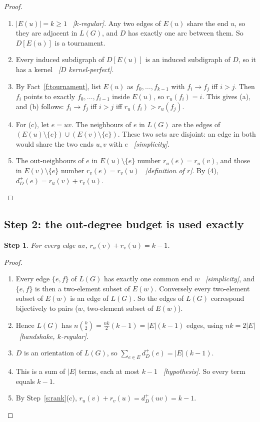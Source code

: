 \documentclass[11pt]{article}
\theoremstyle{plain}
\newtheorem{claim}{Step}
\theoremstyle{definition}
\newcommand{\LG}{L(G)}
\newcommand{\st}[1]{E(#1)}
\newcommand{\dout}{d^{+}}
\newcommand{\why}[1]{\unskip\ \textit{[#1]}}
\newenvironment{steps}{\begin{enumerate}[label=(\arabic*),leftmargin=2.2em,itemsep=0.35em]}{\end{enumerate}}
\begin{document}
\begin{proof}
\begin{steps}
  \item $|\st{u}|=k\ge 1$ \why{$k$-regular}. Any two edges of $\st{u}$ share the end $u$, so they
    are adjacent in $\LG$, and $D$ has exactly one arc between them. So $D[\st{u}]$ is a
    tournament.
  \item Every induced subdigraph of $D[\st{u}]$ is an induced subdigraph of $D$, so it has a
    kernel \why{$D$ kernel-perfect}.
  \item By Fact~\ref{f:tournament}, list $\st{u}$ as $f_0,\dots,f_{k-1}$ with $f_i\to f_j$ iff
    $i>j$. Then $f_i$ points to exactly $f_0,\dots,f_{i-1}$ inside $\st{u}$, so $r_u(f_i)=i$.
    This gives (a), and (b) follows: $f_i\to f_j$ iff $i>j$ iff $r_u(f_i)>r_u(f_j)$.
  \item For (c), let $e=uv$. The neighbours of $e$ in $\LG$ are the edges of
    $(\st{u}\setminus\{e\})\cup(\st{v}\setminus\{e\})$. These two sets are disjoint: an edge in
    both would share the two ends $u,v$ with $e$ \why{simplicity}.
  \item The out-neighbours of $e$ in $\st{u}\setminus\{e\}$ number $r_u(e)=r_u(v)$, and those in
    $\st{v}\setminus\{e\}$ number $r_v(e)=r_v(u)$ \why{definition of $r$}. By (4),
    $\dout_D(e)=r_u(v)+r_v(u)$. \qedhere
\end{steps}
\end{proof}

\subsection*{Step 2: the out-degree budget is used exactly}

\begin{claim}\label{s:tight}
For every edge $uv$, $r_u(v)+r_v(u)=k-1$.
\end{claim}

\begin{proof}
\begin{steps}
  \item Every edge $\{e,f\}$ of $\LG$ has exactly one common end $w$ \why{simplicity}, and
    $\{e,f\}$ is then a two-element subset of $\st{w}$. Conversely every two-element subset of
    $\st{w}$ is an edge of $\LG$. So the edges of $\LG$ correspond bijectively to pairs
    ($w$, two-element subset of $\st{w}$).
  \item Hence $\LG$ has $n\binom{k}{2}=\tfrac{nk}{2}(k-1)=|E|(k-1)$ edges, using $nk=2|E|$
    \why{handshake, $k$-regular}.
  \item $D$ is an orientation of $\LG$, so $\sum_{e\in E}\dout_D(e)=|E|(k-1)$.
  \item This is a sum of $|E|$ terms, each at most $k-1$ \why{hypothesis}. So every term equals
    $k-1$.
  \item By Step~\ref{s:rank}(c), $r_u(v)+r_v(u)=\dout_D(uv)=k-1$. \qedhere
\end{steps}
\end{proof}
\end{document}
